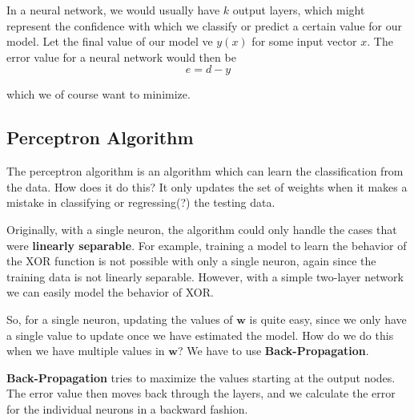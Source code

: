 \documentclass{tufte-handout}
\begin{document}
In a neural network, we would usually have $k$ output layers, which might represent the confidence with which 
	we classify or predict a certain value for our model.
Let the final value of our model ve $y(x)$ for some input vector $x$. The error value for a neural network
	would then be
\[ e = d- y\]

	which we of course want to minimize.

\subsection{Perceptron Algorithm}
The perceptron algorithm is an algorithm which can learn the classification from the data. 
How does it do this?
It only updates the set of weights when it makes a mistake in classifying or regressing(?) the testing data.

Originally, with a single neuron, the algorithm could only handle the cases that were 
\textbf{linearly separable}. 
For example, training a model to learn the behavior of the XOR function is not possible with 
	only a single neuron, again since the training data is not linearly separable.
However, with a simple two-layer network we can easily model the behavior of XOR.

So, for a single neuron, updating the values of $\mathbf{w}$  is quite easy, since we only have a single value
	to update once we have estimated the model. 
How do we do this when we have multiple values in $\mathbf{w}$? 
We have to use \textbf{Back-Propagation}.

\textbf{Back-Propagation} tries to maximize the values starting at the output nodes. 
The error value then moves back through the layers, and we calculate the error for the individual neurons 
	in a backward fashion.
\end{document}
